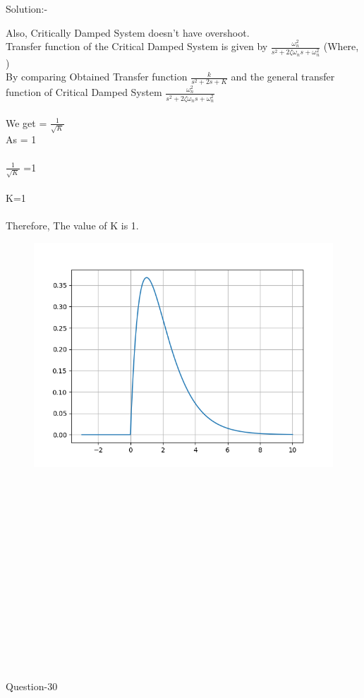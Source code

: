 \documentclass[journal,12pt,twocolumn]{IEEEtran}
\begin{document}
\begin{frame}{Solution:- }
\begin{frame}{}
Also, Critically Damped System doesn't have overshoot.\\
Transfer function of the Critical Damped System is given by
\(\frac{\omega_n^2}{s^2+2\zeta\omega_ns +\omega_n^2}\) (Where, )\\
By comparing Obtained Transfer function \(\frac{k}{s^2+2s+K}\) and the general transfer function of Critical Damped System \(\frac{\omega_n^2}{s^2+2\zeta\omega_ns +\omega_n^2}\)\\
\vspace{5mm}\\
We get \zeta = \(\frac{1}{\sqrt{K}}\)\\
As \zeta = 1\\
\vspace{5mm}\\
\(\frac{1}{\sqrt{K}}\) =1\\
\vspace{5mm}\\
K=1\\
\vspace{5mm}\\
Therefore, The value of K is 1.\\




\end{frame}
\begin{frame}{}
\begin{figure}[h]
    \includegraphics[scale=0.65]{./figs/fig-6.png}
    
\end{figure}
\\\\
\\\\
\end{frame}
\\\\\\\\
\\\\\\\\\
\begin{frame}{Question-30 }
\begin{block}


\end{block}
\end{frame}
\end{frame}
\end{document}
